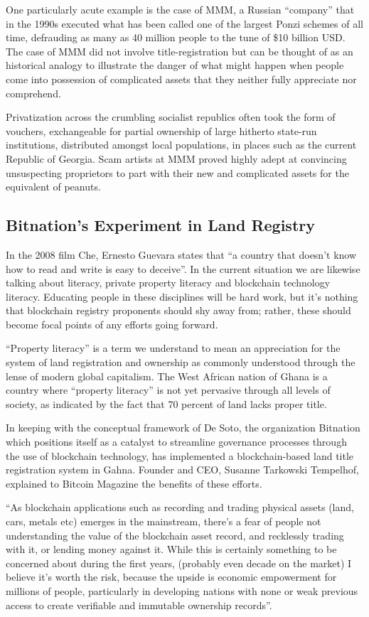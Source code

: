 One particularly acute example is the case of MMM, a Russian ``company'' that in the 1990s executed what has been called one of the largest Ponzi schemes of all time, defrauding as many as 40 million people to the tune of \$10 billion USD. The case of MMM did not involve title-registration but can be thought of as an historical analogy to illustrate the danger of what might happen when people come into possession of complicated assets that they neither fully appreciate nor comprehend.

Privatization across the crumbling socialist republics often took the form of vouchers, exchangeable for partial ownership of large hitherto state-run institutions, distributed amongst local populations, in places such as the current Republic of Georgia. Scam artists at MMM proved highly adept at convincing unsuspecting proprietors to part with their new and complicated assets for the equivalent of peanuts.  

\subsection*{Bitnation's Experiment in Land Registry}

In the 2008 film Che, Ernesto Guevara states that ``a country that doesn't know how to read and write is easy to deceive''. In the current situation we are likewise talking about literacy, private property literacy and blockchain technology literacy. Educating people in these disciplines will be hard work, but it's nothing that blockchain registry proponents should shy away from; rather, these should become focal points of any efforts going forward.  

``Property literacy'' is a term we understand to mean an appreciation for the system of land registration and ownership as commonly understood through the lense of modern global capitalism. The West African nation of Ghana is a country where ``property literacy'' is not yet pervasive through all levels of society, as indicated by the fact that 70 percent of land lacks proper title.

In keeping with the conceptual framework of De Soto, the organization Bitnation which positions itself as a catalyst to streamline governance processes through the use of blockchain technology, has implemented a blockchain-based land title registration system in Gahna. Founder and CEO, Susanne Tarkowski Tempelhof, explained to Bitcoin Magazine the benefits of these efforts.

``As blockchain applications such as recording and trading physical assets (land, cars, metals etc) emerges in the mainstream, there's a fear of people not understanding the value of the blockchain asset record, and recklessly trading with it, or lending money against it. While this is certainly something to be concerned about during the first years, (probably even decade on the market) I believe it's worth the risk, because the upside is economic empowerment for millions of people, particularly in developing nations with none or weak previous access to create verifiable and immutable ownership records''.

